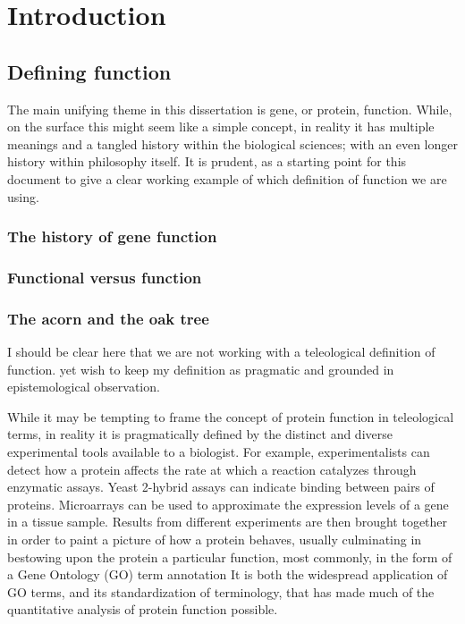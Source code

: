
\chapter{Introduction}


\section{Defining function}
The main unifying theme in this dissertation is gene, or protein, function.  While, on the surface this might seem like a simple concept, in reality it has multiple meanings and a tangled history within the biological sciences; with an even longer history within philosophy itself.  It is  prudent, as a starting point for this document to give a clear working example of which definition of function we are using.

\subsection{The history of gene function}

\subsection{Functional versus function}

\subsection{The acorn and the oak tree}

I should be clear here that we are not working with a teleological definition of function.   yet wish to keep my definition as pragmatic and grounded in epistemological observation.  




While it may be tempting to frame the concept of protein function
in teleological terms, in reality it is pragmatically defined by the
distinct and diverse experimental tools available to a biologist.
For example, experimentalists can detect how a protein affects the
rate at which a reaction catalyzes through enzymatic assays. Yeast
2-hybrid assays can indicate binding between pairs of proteins. Microarrays
can be used to approximate the expression levels of a gene in a tissue
sample. Results from different experiments are then brought together
in order to paint a picture of how a protein behaves, usually culminating
in bestowing upon the protein a particular function, most commonly,
in the form of a Gene Ontology (GO) term annotation 
It is both the widespread application of GO terms, and its standardization
of terminology, that has made much of the quantitative analysis of
protein function possible.




